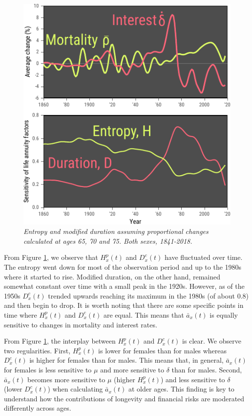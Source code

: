 \documentclass[12pt]{article}
\begin{document}
\begin{figure}[!ht]
	\centering
	\includegraphics[width=1\textwidth]{Fig/Fig3}
	\caption{\textit{Entropy and modified duration assuming proportional changes calculated at ages 65, 70 and 75. Both sexes, 1841-2018.}}
	\label{fig:Fig3}
\end{figure}



From Figure \ref{fig:Fig3}, we observe that ${H}^{p}_x(t)$ and ${D}^{c}_x(t)$ have fluctuated over time. The entropy went down for most of the observation period and up to the 1980s where it started to rise. Modified duration, on the other hand, remained somewhat constant over time with a small peak in the 1920s. However, as of the 1950s ${D}^{c}_x(t)$ trended upwards reaching its maximum in the 1980s (of about 0.8) and then begin to drop. It is worth noting that there are some specific points in time where ${H}^{p}_x(t)$ and ${D}^{c}_x(t)$ are equal. This means that $\bar{a}_x(t)$ is equally sensitive to changes in mortality and interest rates.

From Figure \ref{fig:Fig3}, the interplay between ${H}^{p}_x(t)$ and ${D}^{c}_x(t)$ is clear. We observe two regularities. First, ${H}^{p}_x(t)$ is lower for females than for males whereas ${D}^{c}_x(t)$ is higher for females than for males. This means that, in general, $\bar{a}_x(t)$ for females is less sensitive to $\mu$ and more sensitive to $\delta$ than for males. Second, $\bar{a}_x(t)$ becomes more sensitive to $\mu$ (higher ${H}^{p}_x(t)$) and less sensitive to $\delta$ (lower ${D}^{c}_x(t)$) when calculating $\bar{a}_x(t)$ at older ages. This finding is key to understand how the contributions of longevity and financial risks are moderated differently across ages.
\end{document}
